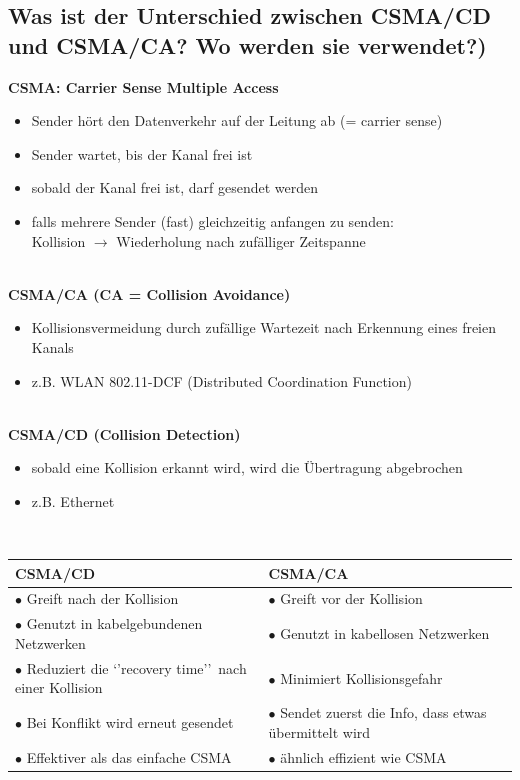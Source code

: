 \subsection*{Was ist der Unterschied zwischen CSMA/CD und CSMA/CA? Wo werden sie verwendet?)}\label{sub:csma}
\textbf{CSMA: Carrier Sense Multiple Access}
\begin{itemize}
    \item Sender hört den Datenverkehr auf der Leitung ab (= carrier sense)
    \item Sender wartet, bis der Kanal frei ist
    \item sobald der Kanal frei ist, darf gesendet werden
    \item falls mehrere Sender (fast) gleichzeitig anfangen zu senden:\\Kollision $\rightarrow$ Wiederholung nach zufälliger Zeitspanne
\end{itemize}\,\\

\textbf{CSMA/CA (CA = Collision Avoidance)}
\begin{itemize}
    \item Kollisionsvermeidung durch zufällige Wartezeit nach Erkennung eines freien Kanals
    \item z.B. WLAN 802.11-DCF (Distributed Coordination Function)
\end{itemize}\,\\

\textbf{CSMA/CD (Collision Detection)}
\begin{itemize}
    \item sobald eine Kollision erkannt wird, wird die Übertragung abgebrochen
    \item z.B. Ethernet
\end{itemize}\,\\

\begin{tabularx}{\textwidth}{X|X}
    \multicolumn{1}{X}{CSMA/CD}&\multicolumn{1}{X}{CSMA/CA}\\
    \hline
    $\bullet$ Greift nach der Kollision&$\bullet$ Greift vor der Kollision\\
    $\bullet$ Genutzt in kabelgebundenen Netzwerken&$\bullet$ Genutzt in kabellosen Netzwerken\\
    $\bullet$ Reduziert die `'recovery time'' nach einer Kollision&$\bullet$ Minimiert Kollisionsgefahr\\
    $\bullet$ Bei Konflikt wird erneut gesendet&$\bullet$ Sendet zuerst die Info, dass etwas übermittelt wird\\
    $\bullet$ Effektiver als das einfache CSMA&$\bullet$ ähnlich effizient wie CSMA\\
\end{tabularx}

